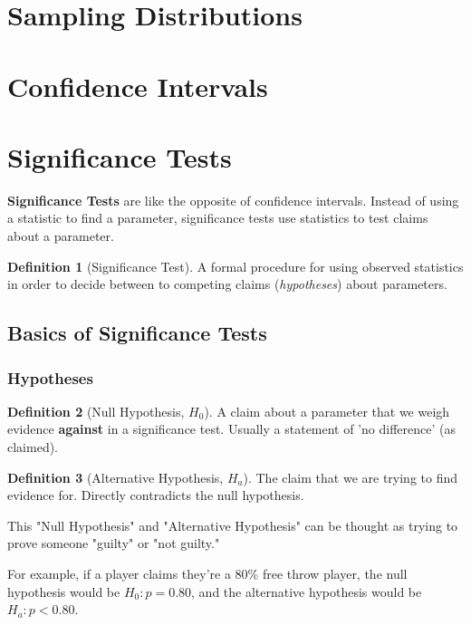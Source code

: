 \documentclass[12pt, a4paper]{article}
\theoremstyle{definition}
\newtheorem{definition}{Definition}
\begin{document}
\section{Sampling Distributions}

\newpage

\section{Confidence Intervals}

\newpage

\section{Significance Tests}
\textbf{Significance Tests} are like the opposite of confidence intervals. Instead of using a statistic to find a parameter, significance tests use statistics to test claims about a parameter.

\begin{definition}[Significance Test]
    A formal procedure for using observed statistics in order to decide between to competing claims (\textit{hypotheses}) about parameters.
\end{definition}

\subsection{Basics of Significance Tests}
\subsubsection{Hypotheses}
\begin{definition}[Null Hypothesis, $H_0$]
    A claim about a parameter that we weigh evidence \textbf{against} in a significance test. Usually a statement of 'no difference' (as claimed).
\end{definition}

\begin{definition}[Alternative Hypothesis, $H_a$]
    The claim that we are trying to find evidence for. Directly contradicts the null hypothesis.
\end{definition}

This "Null Hypothesis" and "Alternative Hypothesis" can be thought as trying to prove someone "guilty" or "not guilty."

For example, if a player claims they're a 80\% free throw player, the null hypothesis would be $H_0: p = 0.80$, and the alternative hypothesis would be $H_a: p < 0.80$.
\end{document}
